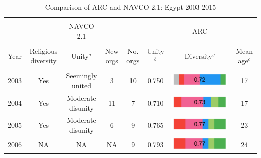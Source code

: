 \begin{landscape}

\singlespacing

\begin{table}[!htbp] \centering 
  \caption{Comparison of ARC and NAVCO 2.1: Egypt 2003-2015} 
  \label{Tab: Comparison} 
\begin{tabular}{cccc|cccc} 
\\[-1.8ex]\hline 
\hline \\[-1.8ex] 

 & \multicolumn{1}{c}{} & \multicolumn{1}{c}{NAVCO 2.1} &  \multicolumn{1}{c|}{} & \multicolumn{1}{c}{} & \multicolumn{1}{c}{} & \multicolumn{1}{c}{ARC}                                & \multicolumn{1}{c}{}\\
\hline \\[-1.8ex] 
Year & \multicolumn{1}{c}{Religious diversity} & \multicolumn{1}{c}{Unity$^a$} &  \multicolumn{1}{c|}{New orgs} & \multicolumn{1}{c}{No. orgs} & \multicolumn{1}{c}{Unity$^b$} & \multicolumn{1}{c}{Diversity$^g$}                                & \multicolumn{1}{c}{Mean age$^c$}\\
\hline \\[-1.8ex] 
2003 &     Yes     &                         Seemingly united   &                                      3 &                     10 &                    0.750  &         \includegraphics[width = 0.15\columnwidth]{img/ideo2003.jpg}   &    17  \\ 

2004  &     Yes   &                             Moderate disunity   &                                   11 &                    7 &                      0.710  &        \includegraphics[width = 0.15\columnwidth]{img/ideo2004.jpg}   &         17    \\ 

2005  &     Yes     &                        Moderate disunity   &                                      6 &                     9 &                     0.765  &        \includegraphics[width = 0.15\columnwidth]{img/ideo2005.jpg}   &         23    \\ 

2006  &     NA   &                           NA   &                                     NA  &                   9 &                     0.793  &        \includegraphics[width = 0.15\columnwidth]{img/ideo2006.jpg}  &          24    \\ 


\end{tabular}
\end{table}
\end{landscape}
